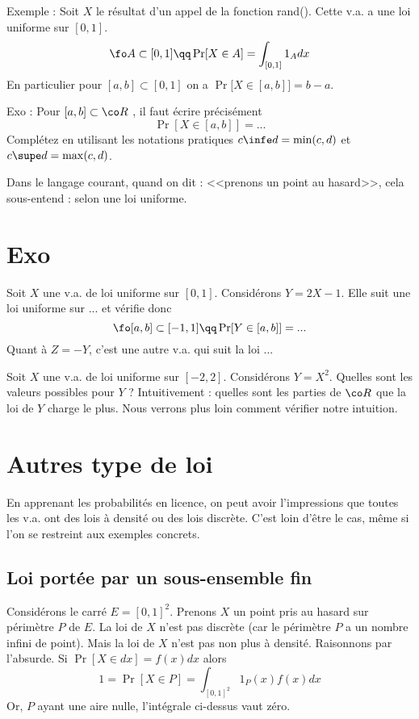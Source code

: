 \documentclass{article}
\begin{document}
Exemple : Soit $X$ le résultat d'un appel de la fonction rand().  Cette v.a. a une loi uniforme sur $[0,1]$. 
$$
\fo A \subset [0,1] \qq  \Pr[X \in A ] = \int_{[0,1]}  1_A  dx
$$ 
En particulier pour $[a,b]\subset [0,1]$ on a  $\Pr\Big[X \in  [a,b] \Big] = b-a$. 

Exo : Pour $[a,b]\subset \co R $ , il faut écrire précisément  
$$
\Pr[X \in  [a,b] ] = ... 
$$
   Complétez en utilisant les notations pratiques $c \infe d = \min(c,d)$ et  $c \supe d = \max(c,d)$.



Dans le langage courant, quand on dit : <<prenons un point au hasard>>, cela sous-entend : selon une loi uniforme. 



\section{Exo}

 Soit  $X$  une v.a. de loi uniforme sur $[0,1]$. Considérons $Y=2X-1$. Elle suit une loi uniforme sur ...   et vérifie donc 
$$
\fo [a,b] \subset [-1,1] \qq \Pr[Y \in  [a,b] ] = ... 
$$
Quant à $Z=-Y$,  c'est une autre v.a. qui suit la loi ... 

Soit $X$ une v.a. de loi uniforme sur $[-2,2]$. Considérons $Y=X^2$. Quelles sont les valeurs possibles pour $Y$ ? Intuitivement :  quelles sont les parties de $\co R$ que la loi de  $Y$ charge le plus. 
Nous verrons plus loin comment vérifier notre intuition. 








\section{Autres type de loi}


En apprenant les  probabilités en licence, on peut avoir  l'impressions que toutes les v.a. ont des lois à densité ou des lois discrète. C'est loin d'être le cas, même si l'on se restreint aux exemples concrets.  



\subsection{Loi portée par un sous-ensemble fin}


Considérons le carré $E=[0,1]^2$. Prenons $X$ un  point pris au hasard sur périmètre $P$ de $E$.     La loi de $X$ n'est pas discrète (car le périmètre $P$ a un nombre infini de point). Mais la loi de $X$ n'est pas non plus à densité. Raisonnons par l'absurde. Si $\Pr[X\in dx] = f(x) dx$ alors  
$$
1=  \Pr[X\in P ] =  \int_{[0,1]^2} 1_P (x) f(x) dx
 $$  
 Or, $P$ ayant une aire nulle, l'intégrale ci-dessus vaut zéro. 
 
\end{document}
